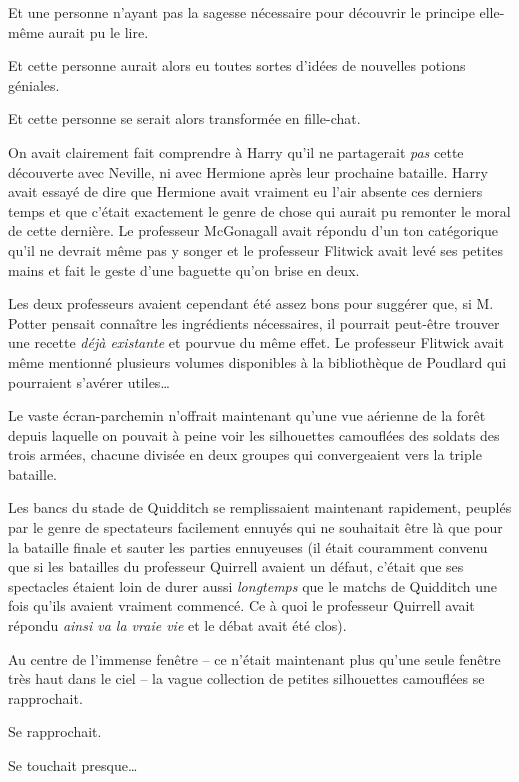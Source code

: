 Et une personne n'ayant pas la sagesse nécessaire pour découvrir le principe elle-même aurait pu le lire.

Et cette personne aurait alors eu toutes sortes d'idées de nouvelles potions géniales.

Et cette personne se serait alors transformée en fille-chat.

On avait clairement fait comprendre à Harry qu'il ne partagerait \emph{pas} cette découverte avec Neville, ni avec Hermione après leur prochaine bataille. Harry avait essayé de dire que Hermione avait vraiment eu l'air absente ces derniers temps et que c'était exactement le genre de chose qui aurait pu remonter le moral de cette dernière. Le professeur McGonagall avait répondu d'un ton catégorique qu'il ne devrait même pas y songer et le professeur Flitwick avait levé ses petites mains et fait le geste d'une baguette qu'on brise en deux.

Les deux professeurs avaient cependant été assez bons pour suggérer que, si M. Potter pensait connaître les ingrédients nécessaires, il pourrait peut-être trouver une recette \emph{déjà existante} et pourvue du même effet. Le professeur Flitwick avait même mentionné plusieurs volumes disponibles à la bibliothèque de Poudlard qui pourraient s'avérer utiles…

\later

Le vaste écran-parchemin n'offrait maintenant qu'une vue aérienne de la forêt depuis laquelle on pouvait à peine voir les silhouettes camouflées des soldats des trois armées, chacune divisée en deux groupes qui convergeaient vers la triple bataille.

Les bancs du stade de Quidditch se remplissaient maintenant rapidement, peuplés par le genre de spectateurs facilement ennuyés qui ne souhaitait être là que pour la bataille finale et sauter les parties ennuyeuses (il était couramment convenu que si les batailles du professeur Quirrell avaient un défaut, c'était que ses spectacles étaient loin de durer aussi \emph{longtemps} que le matchs de Quidditch une fois qu'ils avaient vraiment commencé. Ce à quoi le professeur Quirrell avait répondu \emph{ainsi va la vraie vie} et le débat avait été clos).

Au centre de l'immense fenêtre -- ce n'était maintenant plus qu'une seule fenêtre très haut dans le ciel -- la vague collection de petites silhouettes camouflées se rapprochait.

Se rapprochait.

Se touchait presque…

